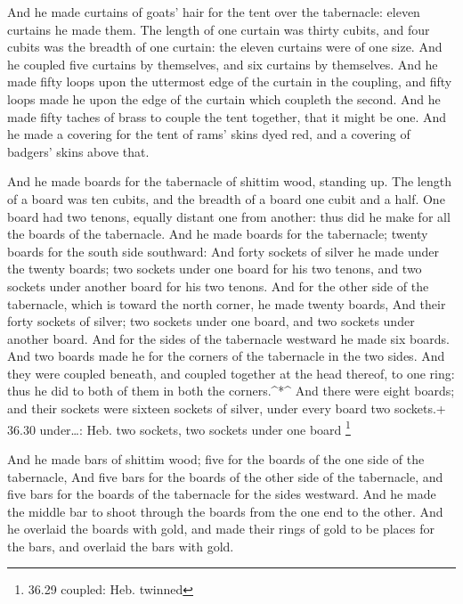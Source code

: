  And he made curtains of goats' hair for the tent over the
tabernacle: eleven curtains he made them.  The length of
one curtain was thirty cubits, and four cubits was the breadth of one
curtain: the eleven curtains were of one size.  And he
coupled five curtains by themselves, and six curtains by themselves.
 And he made fifty loops upon the uttermost edge of the
curtain in the coupling, and fifty loops made he upon the edge of the
curtain which coupleth the second.  And he made fifty
taches of brass to couple the tent together, that it might be one.
 And he made a covering for the tent of rams' skins dyed
red, and a covering of badgers' skins above that.

 And he made boards for the tabernacle of shittim wood,
standing up.  The length of a board was ten cubits, and the
breadth of a board one cubit and a half.  One board had two
tenons, equally distant one from another: thus did he make for all the
boards of the tabernacle.  And he made boards for the
tabernacle; twenty boards for the south side southward: 
And forty sockets of silver he made under the twenty boards; two sockets
under one board for his two tenons, and two sockets under another board
for his two tenons.  And for the other side of the
tabernacle, which is toward the north corner, he made twenty boards,
 And their forty sockets of silver; two sockets under one
board, and two sockets under another board.  And for the
sides of the tabernacle westward he made six boards.  And
two boards made he for the corners of the tabernacle in the two sides.
 And they were coupled beneath, and coupled together at the
head thereof, to one ring: thus he did to both of them in both the
corners.\^{}*\^{}  And there were eight boards; and their
sockets were sixteen sockets of silver, under every board two sockets.+
36.30 under\ldots: Heb. two sockets, two sockets under one board
\footnote{36.29 coupled: Heb. twinned}

 And he made bars of shittim wood; five for the boards of
the one side of the tabernacle,  And five bars for the
boards of the other side of the tabernacle, and five bars for the boards
of the tabernacle for the sides westward.  And he made the
middle bar to shoot through the boards from the one end to the other.
 And he overlaid the boards with gold, and made their rings
of gold to be places for the bars, and overlaid the bars with gold.

